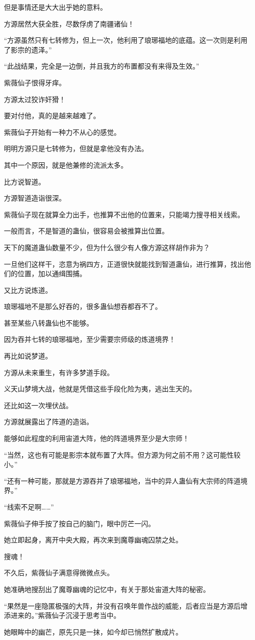 \begin{this_body}
但是事情还是大大出乎她的意料。

方源居然大获全胜，尽数俘虏了南疆诸仙！

“方源虽然只有七转修为，但上一次，他利用了琅琊福地的底蕴。这一次则是利用了影宗的遗泽。”

“此战结果，完全是一边倒，并且我方的布置都没有来得及生效。”

紫薇仙子恨得牙痒。

方源太过狡诈奸猾！

要对付他，真的是越来越难了。

紫薇仙子开始有一种力不从心的感觉。

明明方源只是七转修为，但就是拿他没有办法。

其中一个原因，就是他兼修的流派太多。

比方说智道。

方源智道造诣很深。

紫薇仙子现在就算全力出手，也推算不出他的位置来，只能竭力搜寻相关线索。

一般而言，不是智道的蛊仙，很容易会被推算出位置。

天下的魔道蛊仙数量不少，但为什么很少有人像方源这样胡作非为？

一旦他们这样干，恣意为祸四方，正道很快就能找到智道蛊仙，进行推算，找出他们的位置，加以通缉围捕。

又比方说炼道。

琅琊福地不是那么好吞的，很多蛊仙想吞都吞不了。

甚至某些八转蛊仙也不能够。

因为吞并七转的琅琊福地，至少需要宗师级的炼道境界！

再比如说梦道。

方源从未来重生，有许多梦道手段。

义天山梦境大战，他就是凭借这些手段化险为夷，逃出生天的。

还比如这一次埋伏战。

方源就展露出了阵道的造诣。

能够如此程度的利用宙道大阵，他的阵道境界至少是大宗师！

“当然，这也有可能是影宗本就布置了大阵。但方源为何之前不用？这可能性较小。”

“还有一种可能，那就是方源吞并了琅琊福地，当中的异人蛊仙有大宗师的阵道境界。”

“线索不足啊……”

紫薇仙子伸手按了按自己的脑门，眼中厉芒一闪。

她立即起身，离开中央大殿，再次来到魔尊幽魂囚禁之处。

搜魂！

不久后，紫薇仙子满意得微微点头。

她准确地搜刮出了魔尊幽魂的记忆中，有关于那处宙道大阵的秘密。

“果然是一座隐匿极强的大阵，并没有召唤年兽作战的威能，后者应当是方源后增添进来的。”紫薇仙子沉浸于思考当中。

她眼眸中的幽芒，原先只是一抹，如今却已悄然扩散成片。

\end{this_body}

